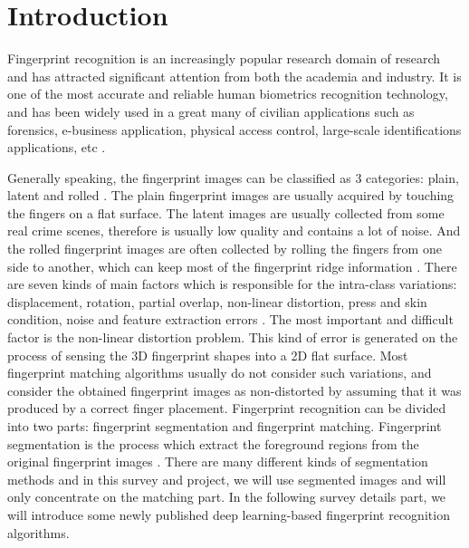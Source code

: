 \section{Introduction}

Fingerprint recognition is an increasingly popular research domain of research and has attracted significant attention from both the academia and industry.
It is one of the most accurate and reliable human biometrics recognition technology, and has been widely used in a great many of civilian applications such as forensics, e-business application, physical access control, large-scale identifications applications, etc \cite{finger-handbook}.

Generally speaking, the fingerprint images can be classified as 3 categories: plain, latent and rolled \cite{nimkarFingerprintSegmentationAlgorithms2014}.
The plain fingerprint images are usually acquired by touching the fingers on a flat surface.
The latent images are usually collected from some real crime scenes, therefore is usually low quality and contains a lot of noise.
And the rolled fingerprint images are often collected by rolling the fingers from one side to another, which can keep most of the fingerprint ridge information \cite{nimkarFingerprintSegmentationAlgorithms2014}.
There are seven kinds of main factors which is responsible for the intra-class variations:  displacement, rotation, partial overlap, non-linear distortion, press and skin condition,  noise and feature extraction errors \cite{finger-handbook}.
The most important and difficult factor is the  non-linear distortion problem. This kind of error is generated on the process of sensing  the 3D fingerprint shapes into a 2D flat surface. Most fingerprint matching algorithms  usually do not consider such variations, and consider the obtained fingerprint images  as non-distorted by assuming that it was produced by a correct finger placement.  Fingerprint recognition can be divided into two parts: fingerprint segmentation and  fingerprint matching. Fingerprint segmentation is the process which extract the  foreground regions from the original fingerprint images \cite{finger-handbook}. There are many different  kinds of segmentation methods and in this survey and project, we will use segmented  images and will only concentrate on the matching part. In the following survey details  part, we will introduce some newly published deep learning-based fingerprint  recognition algorithms.  
